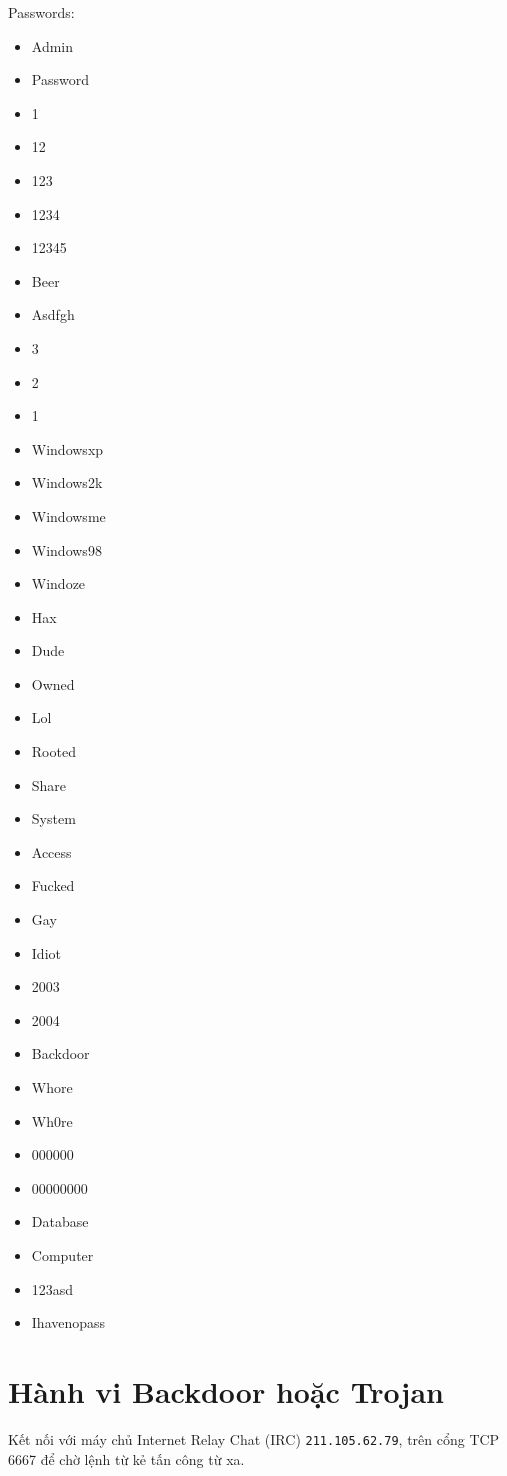 Passwords:
\begin{itemize}
\item Admin
\item Password
\item 1
\item 12
\item 123
\item 1234
\item 12345
\item Beer
\item Asdfgh
\item 3
\item 2
\item 1
\item Windowsxp
\item Windows2k
\item Windowsme
\item Windows98
\item Windoze
\item Hax
\item Dude
\item Owned
\item Lol
\item Rooted
\item Share
\item System
\item Access
\item Fucked
\item Gay
\item Idiot
\item 2003
\item 2004
\item Backdoor
\item Whore
\item Wh0re
\item 000000
\item 00000000
\item Database
\item Computer
\item 123asd
\item Ihavenopass
\end{itemize}

\section{Hành vi Backdoor hoặc Trojan}
Kết nối với máy chủ Internet Relay Chat (IRC) \texttt{211.105.62.79}, trên cổng TCP 6667 để chờ lệnh từ kẻ tấn công từ xa.

